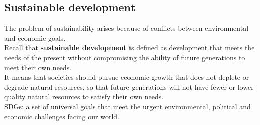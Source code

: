 \documentclass[a4paper,12pt]{article}
\newcommand{\needbold}[1]{\textcolor{red!70!black}{\textbf{#1}}}
\begin{document}
\subsection{Sustainable development}
The problem of sustainability arises because of conflicts between environmental and economic goals.\\
Recall that \needbold{sustainable development} is defined as development that meets the needs of the present without compromising the ability of future generations to meet their own needs.\\
It means that societies should pursue economic growth that does not deplete or degrade natural resources, so that future generations will not have fewer or lower-quality natural resources to satisfy their own needs.\\
SDGs: a set of universal goals that meet the urgent environmental, political and economic challenges facing our world.
\end{document}
